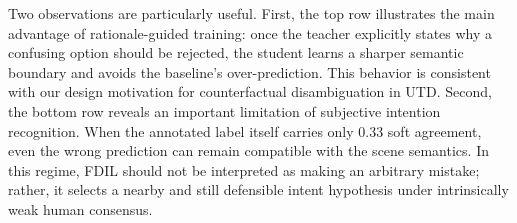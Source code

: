 Two observations are particularly useful. First, the top row illustrates the main advantage of rationale-guided training: once the teacher explicitly states why a confusing option should be rejected, the student learns a sharper semantic boundary and avoids the baseline's over-prediction. This behavior is consistent with our design motivation for counterfactual disambiguation in UTD. Second, the bottom row reveals an important limitation of subjective intention recognition. When the annotated label itself carries only 0.33 soft agreement, even the wrong prediction can remain compatible with the scene semantics. In this regime, FDIL should not be interpreted as making an arbitrary mistake; rather, it selects a nearby and still defensible intent hypothesis under intrinsically weak human consensus.
